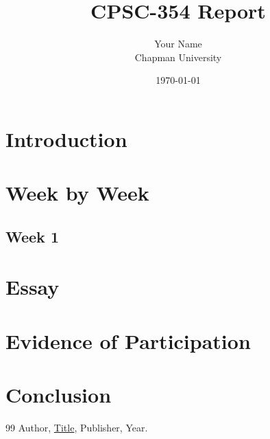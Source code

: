 \documentclass{article}
\title{CPSC-354 Report}
\author{Your Name  \\ Chapman University}
\date{\today}
\theoremstyle{plain}
\theoremstyle{definition}
\theoremstyle{remark}
\begin{document}
\maketitle

\begin{abstract}
\end{abstract}

\setcounter{tocdepth}{3}
\tableofcontents

\section{Introduction}\label{intro}

\section{Week by Week}\label{homework}

\subsection{Week 1}

\section{Essay}

\section{Evidence of Participation}

\section{Conclusion}\label{conclusion}

\begin{thebibliography}{99}
 Author, \href{https://en.wikipedia.org/wiki/LaTeX}{Title}, Publisher, Year.
\end{thebibliography}
\end{document}
